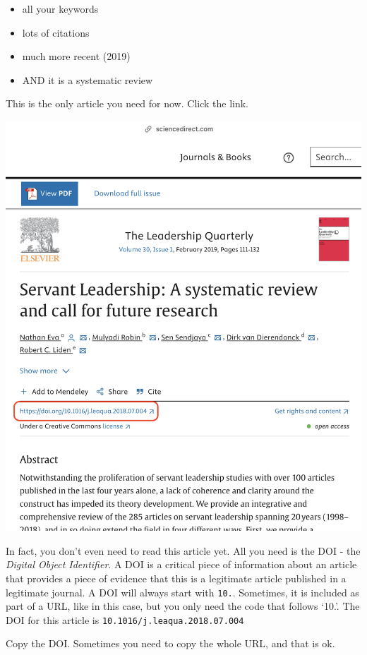 \documentclass[
]{book}
\providecommand{\tightlist}{%
  \setlength{\itemsep}{0pt}\setlength{\parskip}{0pt}}
\theoremstyle{definition}
\theoremstyle{definition}
\theoremstyle{definition}
\theoremstyle{definition}
\theoremstyle{remark}
\begin{document}
\begin{itemize}
\tightlist
\item
  all your keywords
\item
  lots of citations
\item
  much more recent (2019)
\item
  AND it is a systematic review
\end{itemize}

This is the only article you need for now. Click the link.

\includegraphics{assets/u2/google-search3.png}

In fact, you don't even need to read this article yet. All you need is the DOI - the \emph{Digital Object Identifier}. A DOI is a critical piece of information about an article that provides a piece of evidence that this is a legitimate article published in a legitimate journal. A DOI will always start with \texttt{10.}. Sometimes, it is included as part of a URL, like in this case, but you only need the code that follows `10.'. The DOI for this article is \texttt{10.1016/j.leaqua.2018.07.004}

Copy the DOI. Sometimes you need to copy the whole URL, and that is ok.
\end{document}
